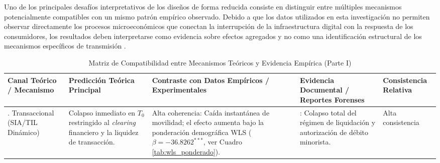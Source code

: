 Uno de los principales desaf\'ios interpretativos de los dise\~nos de forma reducida consiste en distinguir entre m\'ultiples mecanismos potencialmente compatibles con un mismo patr\'on emp\'irico observado. Debido a que los datos utilizados en esta investigaci\'on no permiten observar directamente los procesos microecon\'omicos que conectan la interrupci\'on de la infraestructura digital con la respuesta de los consumidores, los resultados deben interpretarse como evidencia sobre efectos agregados y no como una identificaci\'on estructural de los mecanismos espec\'ificos de transmisi\'on \citep{angrist2009mostly, cunningham2021causal}.

\begin{table}[H]
    \centering
    \caption{Matriz de Compatibilidad entre Mecanismos Te\'oricos y Evidencia Emp\'irica (Parte I)}
    \label{tab:viabilidad_canales_p1}
    \small
    \setlength{\tabcolsep}{4pt} 
    \begin{tabularx}{\textwidth}{>{\raggedright\arraybackslash}p{2.8cm}XXX>{\raggedright\arraybackslash}p{2.3cm}}
        \toprule
        \textbf{Canal Te\'orico / Mecanismo} & \textbf{Predicci\'on Te\'orica Principal} & \textbf{Contraste con Datos Emp\'iricos / Experimentales} & \textbf{Evidencia Documental / Reportes Forenses} & \textbf{Consistencia Relativa} \\
        \midrule
        1. Transaccional \newline (SIA/TIL Din\'amico) & Colapso inmediato en $T_0$ restringido al \textit{clearing} financiero y la liquidez de transacci\'on. & Alta coherencia: Ca\'ida instant\'anea de movilidad; el efecto aumenta bajo la ponderaci\'on demogr\'afica WLS ($\beta = -36.8262^{***}$, ver Cuadro \ref{tab:wls_ponderado}). & \parencite{interac2022statement}: Colapso total del r\'egimen de liquidaci\'on y autorizaci\'on de d\'ebito minorista. & Alta consistencia \\
        \bottomrule
    \end{tabularx}
\end{table}

